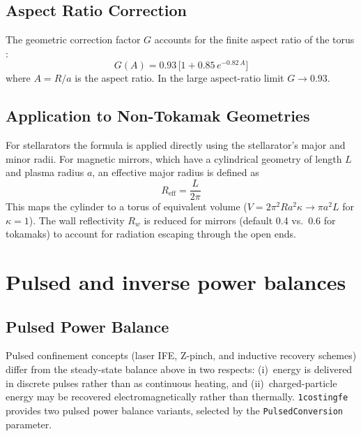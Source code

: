 \documentclass{article}
\begin{document}
\subsection{Aspect Ratio Correction}

The geometric correction factor $G$ accounts for the finite aspect
ratio of the torus \citep{albajar2001}:
%
\begin{equation}
\label{eq:G-factor}
G(A) = 0.93\,\bigl[1 + 0.85\,e^{-0.82\,A}\bigr]
\end{equation}
%
where $A = R/a$ is the aspect ratio. In the large aspect-ratio limit
$G \to 0.93$.

\subsection{Application to Non-Tokamak Geometries}

For stellarators the formula is applied directly using the
stellarator's major and minor radii. For magnetic mirrors, which have
a cylindrical geometry of length $L$ and plasma radius $a$, an
effective major radius is defined as
%
\begin{equation}
\label{eq:R-eff-mirror}
R_{\text{eff}} = \frac{L}{2\pi}
\end{equation}
%
This maps the cylinder to a torus of equivalent volume
($V = 2\pi^2 R a^2 \kappa \to \pi a^2 L$ for $\kappa = 1$). The
wall reflectivity $R_w$ is reduced for mirrors (default 0.4 vs.\ 0.6
for tokamaks) to account for radiation escaping through the open ends.


\section{Pulsed and inverse power balances}
\label{sec:pulsed-and-inverse-balance}

\subsection{Pulsed Power Balance}
\label{sec:pulsed-balance}

Pulsed confinement concepts (laser IFE, Z-pinch, and inductive
recovery schemes) differ from the steady-state balance above in two
respects: (i)~energy is delivered in discrete pulses rather than as
continuous heating, and (ii)~charged-particle energy may be recovered
electromagnetically rather than thermally. \texttt{1costingfe}
provides two pulsed power balance variants, selected by the
\texttt{PulsedConversion} parameter.
\end{document}
